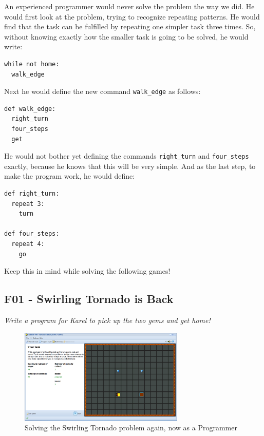 \documentclass[article,A4,12pt]{llncs}
\begin{document}
An experienced programmer would never solve the problem the way we did.
He would first look at the problem, trying to recognize repeating patterns. 
He would find that the task can be fulfilled by repeating one simpler task 
three times. So, without knowing exactly how the smaller task is going to 
be solved, he would write:

{\small
\begin{verbatim}
while not home:
  walk_edge
\end{verbatim}
}
\noindent
Next he would define the new command {\tt walk\_edge} as follows:

{\small
\begin{verbatim}
def walk_edge:
  right_turn
  four_steps
  get
\end{verbatim}
}
\noindent
He would not bother yet defining the commands {\tt right\_turn} and 
{\tt four\_steps} exactly, because he knows that this will be very 
simple. And as the last step, to make the program work, he would 
define:

{\small
\begin{verbatim}
def right_turn:
  repeat 3:
    turn

def four_steps:
  repeat 4:
    go
\end{verbatim}
}
\noindent
Keep this in mind while solving the following games!


\subsection{F01 - Swirling Tornado is Back}

{\em Write a program for Karel to pick up the two gems and get home! }

\begin{figure}[!ht]
\begin{center}
\includegraphics[width=0.7\textwidth]{img/f01.png}
\end{center}
\vspace{-4mm}
\caption{Solving the Swirling Tornado problem again, now as a Programmer}
\label{fig:f01}
\vspace{-10mm}
\end{figure}
\noindent
\newpage
\end{document}
